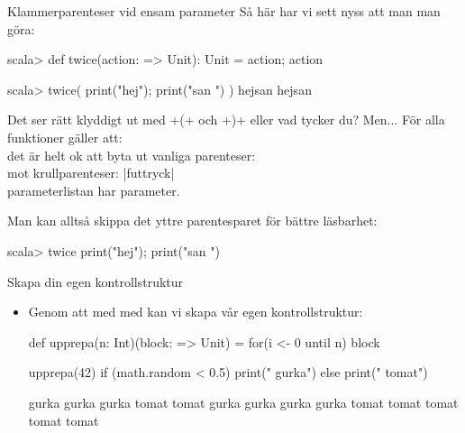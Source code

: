 \begin{Slide}{Klammerparenteser vid ensam parameter}
Så här har vi sett nyss att man man göra:
\begin{REPL}
scala> def twice(action: => Unit): Unit = { action; action }

scala> twice( { print("hej"); print("san ") } )
hejsan hejsan
\end{REPL}

Det ser rätt klyddigt ut med \code+{(+  och \code+)}+ eller vad tycker du? \pause Men...
För alla funktioner  gäller att: \\ det är helt ok att byta ut vanliga parenteser: \hfill{} \\ mot krullparenteser: \hfill\code|f{uttryck}| \\  parameterlistan har  parameter.

\vspace{0.5em}Man kan alltså skippa det yttre parentesparet för bättre läsbarhet:
\begin{REPLnonum}
scala> twice { print("hej"); print("san ") }
\end{REPLnonum}
\end{Slide}



\begin{Slide}{Skapa din egen kontrollstruktur}
\begin{itemize}
\item Genom att   med  med  kan vi skapa vår egen kontrollstruktur:
\begin{Code}
def upprepa(n: Int)(block: => Unit) = {
  for(i <- 0 until n) {
    block
  }
}
\end{Code}

\pause

\begin{Code}
upprepa(42){
  if (math.random < 0.5) print(" gurka")
  else print(" tomat")
}
\end{Code}

\pause

\begin{REPLnonum}
gurka gurka gurka tomat tomat gurka gurka gurka gurka tomat tomat tomat tomat tomat
\end{REPLnonum}
\end{itemize}
\end{Slide}


